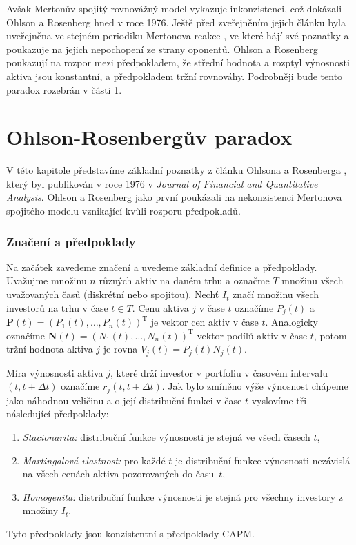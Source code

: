 \documentclass[a4paper,12pt]{report}
\theoremstyle{definition} \newtheorem{definice}[veta]{Definice}
\theoremstyle{remark}
\begin{document}
Avšak Mertonův spojitý rovnovážný model vykazuje inkonzistenci, což dokázali Ohlson a Rosenberg \cite{ohlson} hned v roce 1976.
Ještě před zveřejněním jejich článku byla uveřejněna ve stejném periodiku Mertonova reakce \cite{merton1975}, ve které hájí své poznatky a poukazuje na jejich nepochopení ze strany oponentů.  
Ohlson a Rosenberg \cite {ohlson} poukazují na rozpor mezi předpokladem, že střední hodnota a rozptyl výnosnosti aktiva jsou konstantní, a předpokladem tržní rovnováhy.
Podrobněji bude tento paradox rozebrán v části \ref{paradox}.


\section{Ohlson-Rosenbergův paradox}\label{paradox}
V této kapitole představíme základní poznatky z článku Ohlsona a Rosenberga \cite{ohlson}, který byl publikován v roce 1976 v \textit{Journal of Financial and Quantitative Analysis}.
Ohlson a Rosenberg jako první poukázali na nekonzistenci Mertonova spojitého modelu \cite{merton1971} vznikající kvůli rozporu předpokladů.

\subsubsection{Značení a předpoklady}
Na začátek zavedeme značení a  uvedeme základní definice a předpoklady. 
Uvažujme množinu $n$ různých aktiv na daném trhu a označme $T$ množinu všech uvažovaných časů (diskrétní nebo spojitou).
Nechť $I_t$ značí množinu všech investorů na trhu v čase $t\in T$.
Cenu aktiva $j$ v čase $t$ označíme $P_j(t)$ a $\boldsymbol{P}(t)=(P_1(t),\dots,P_n(t))^\mathrm{T}$ je vektor cen aktiv v čase $t$.
Analogicky označíme $\boldsymbol{N}(t)=(N_1(t),\dots,N_n(t))^\mathrm{T}$ vektor podílů aktiv v čase $t$, potom tržní hodnota aktiva $j$ je rovna $V_j(t)=P_j(t)N_j(t)$.

Míra výnosnosti aktiva $j$, které drží investor v portfoliu v časovém intervalu $(t,t+\Delta t)$ označíme $r_j(t,t+\Delta t)$.
Jak bylo zmíněno výše výnosnost chápeme jako náhodnou veličinu a o její distribuční funkci v čase $t$ vyslovíme tři následující předpoklady:
\begin{enumerate}
\item \label{Stacionarita} \textit{Stacionarita:} distribuční funkce výnosnosti  je stejná ve všech časech $t$,                                                                            
\item \label{Martingalvl} \textit{Martingalová vlastnost:} pro každé $t$ je distribuční funkce výnosnosti nezávislá na všech cenách aktiva pozorovaných do času~$t$,
\item \label{Homogenita} \textit{Homogenita:} distribuční funkce výnosnosti je stejná pro všechny investory z množiny $I_t$. 
\end{enumerate} 
Tyto předpoklady jsou konzistentní s předpoklady CAPM.
\end{document}
